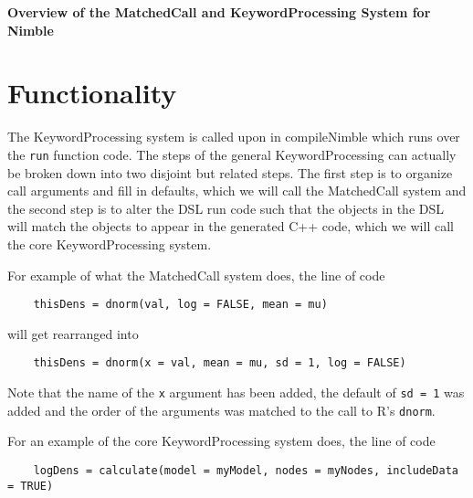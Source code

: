 \documentclass[11pt]{article}
\date{\textbf{Draft} \textbf{\today}}
\numberwithin{equation}{section}
\begin{document}
%


\def\spacingset#1{\renewcommand{\baselinestretch}%
{#1}\small\normalsize} \spacingset{1}



\begin{center}
    {\large\bf Overview of the MatchedCall and KeywordProcessing System for Nimble}
\end{center}
  \medskip


\spacingset{1.4}


\section{Functionality}

	The KeywordProcessing system is called upon in compileNimble which runs over the \texttt{run} function code. The steps of the general KeywordProcessing can actually be broken down into two disjoint but  related steps. The first step is to organize call arguments and fill in defaults, which we will call the MatchedCall system and the second step is to alter the DSL run code such that the objects in the DSL will match the objects to appear in the generated C++ code, which we will call the core KeywordProcessing system. 
	
	For example of what the MatchedCall system does, the line of code
		
	\begin{verbatim}
	thisDens = dnorm(val, log = FALSE, mean = mu)
	\end{verbatim}
	
	will get rearranged into 	

	\begin{verbatim}
	thisDens = dnorm(x = val, mean = mu, sd = 1, log = FALSE)
	\end{verbatim}
		
	
	Note that the name of the \texttt{x} argument has been added, the default of \texttt{sd = 1} was added and the order of the arguments was matched to the call to R's \texttt{dnorm}. 
		
	For an example of the core KeywordProcessing system does, the line of code 
	
	\begin{verbatim}
	logDens = calculate(model = myModel, nodes = myNodes, includeData = TRUE)
	\end{verbatim}
	
\end{document}

